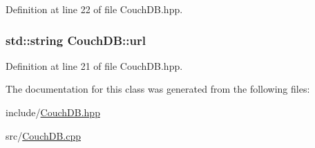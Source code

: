 Definition at line 22 of file Couch\+D\+B.\+hpp.

\subsubsection[{\texorpdfstring{url}{url}}]{\setlength{\rightskip}{0pt plus 5cm}std\+::string Couch\+D\+B\+::url\hspace{0.3cm}{\ttfamily [protected]}}\hypertarget{class_couch_d_b_a1282b49d828b838b8007bbb08ba77a69}{}\label{class_couch_d_b_a1282b49d828b838b8007bbb08ba77a69}


Definition at line 21 of file Couch\+D\+B.\+hpp.



The documentation for this class was generated from the following files\+:\begin{DoxyCompactItemize}
\item 
include/\hyperlink{_couch_d_b_8hpp}{Couch\+D\+B.\+hpp}\item 
src/\hyperlink{_couch_d_b_8cpp}{Couch\+D\+B.\+cpp}\end{DoxyCompactItemize}
